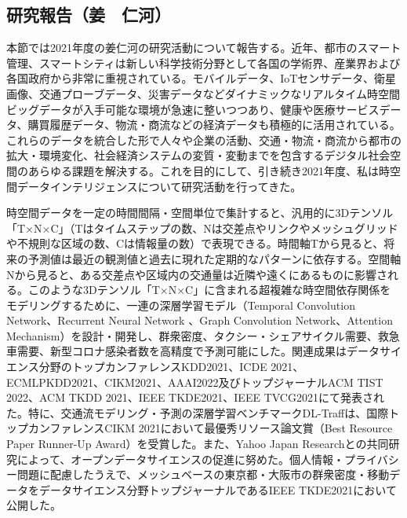 \subsection{研究報告（姜　仁河）}
本節では2021年度の姜仁河の研究活動について報告する。近年、都市のスマート管理、スマートシティは新しい科学技術分野として各国の学術界、産業界および各国政府から非常に重視されている。モバイルデータ、IoTセンサデータ、衛星画像、交通プローブデータ、災害データなどダイナミックなリアルタイム時空間ビッグデータが入手可能な環境が急速に整いつつあり、健康や医療サービスデータ、購買履歴データ、物流・商流などの経済データも積極的に活用されている。これらのデータを統合した形で人々や企業の活動、交通・物流・商流から都市の拡大・環境変化、社会経済システムの変質・変動までを包含するデジタル社会空間のあらゆる課題を解決する。これを目的にして、引き続き2021年度、私は時空間データインテリジェンスについて研究活動を行ってきた。

時空間データを一定の時間間隔・空間単位で集計すると、汎用的に3Dテンソル「T×N×C」（Tはタイムステップの数、Nは交差点やリンクやメッシュグリッドや不規則な区域の数、Cは情報量の数）で表現できる。時間軸Tから見ると、将来の予測値は最近の観測値と過去に現れた定期的なパターンに依存する。空間軸Nから見ると、ある交差点や区域内の交通量は近隣や遠くにあるものに影響される。このような3Dテンソル「T×N×C」に含まれる超複雑な時空間依存関係をモデリングするために、一連の深層学習モデル（Temporal Convolution Network、Recurrent Neural Network 、Graph Convolution Network、Attention Mechanism）を設計・開発し、群衆密度、タクシー・シェアサイクル需要、救急車需要、新型コロナ感染者数を高精度で予測可能にした。関連成果はデータサイエンス分野のトップカンファレンスKDD2021、ICDE 2021、ECMLPKDD2021、CIKM2021、AAAI2022\cite{JIANG2-1,JIANG2-2,JIANG2-3,JIANG2-4,JIANG2-5,JIANG2-6}及びトップジャーナルACM TIST 2022、ACM TKDD 2021、IEEE TKDE2021、IEEE TVCG2021\cite{JIANG1-1,JIANG1-2,JIANG1-3,JIANG1-4,JIANG1-5}にて発表された。特に、交通流モデリング・予測の深層学習ベンチマークDL-Traff\cite{JIANG2-3}は、国際トップカンファレンスCIKM 2021において最優秀リソース論文賞（Best Resource Paper Runner-Up Award）を受賞した。また、Yahoo Japan Researchとの共同研究によって、オープンデータサイエンスの促進に努めた。個人情報・プライバシー問題に配慮したうえで、メッシュベースの東京都・大阪市の群衆密度・移動データをデータサイエンス分野トップジャーナルであるIEEE TKDE2021\cite{JIANG1-4}において公開した。

